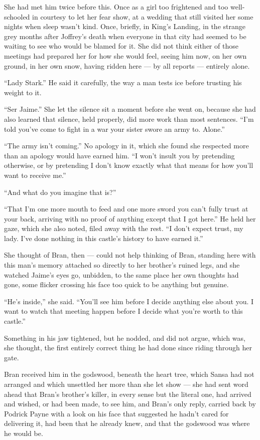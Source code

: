 She had met him twice before this. Once as a girl too frightened and too well-schooled in courtesy to let her fear show, at a wedding that still visited her some nights when sleep wasn’t kind. Once, briefly, in King’s Landing, in the strange grey months after Joffrey’s death when everyone in that city had seemed to be waiting to see who would be blamed for it. She did not think either of those meetings had prepared her for how she would feel, seeing him now, on her own ground, in her own snow, having ridden here — by all reports — entirely alone.

“Lady Stark.” He said it carefully, the way a man tests ice before trusting his weight to it.

“Ser Jaime.” She let the silence sit a moment before she went on, because she had also learned that silence, held properly, did more work than most sentences. “I’m told you’ve come to fight in a war your sister swore an army to. Alone.”

“The army isn’t coming.” No apology in it, which she found she respected more than an apology would have earned him. “I won’t insult you by pretending otherwise, or by pretending I don’t know exactly what that means for how you’ll want to receive me.”

“And what do you imagine that is?”

“That I’m one more mouth to feed and one more sword you can’t fully trust at your back, arriving with no proof of anything except that I got here.” He held her gaze, which she also noted, filed away with the rest. “I don’t expect trust, my lady. I’ve done nothing in this castle’s history to have earned it.”

She thought of Bran, then — could not help thinking of Bran, standing here with this man’s memory attached so directly to her brother’s ruined legs, and she watched Jaime’s eyes go, unbidden, to the same place her own thoughts had gone, some flicker crossing his face too quick to be anything but genuine.

“He’s inside,” she said. “You’ll see him before I decide anything else about you. I want to watch that meeting happen before I decide what you’re worth to this castle.”

Something in his jaw tightened, but he nodded, and did not argue, which was, she thought, the first entirely correct thing he had done since riding through her gate.

\sceneBreak

Bran received him in the godswood, beneath the heart tree, which Sansa had not arranged and which unsettled her more than she let show — she had sent word ahead that Bran’s brother’s killer, in every sense but the literal one, had arrived and wished, or had been made, to see him, and Bran’s only reply, carried back by Podrick Payne with a look on his face that suggested he hadn’t cared for delivering it, had been that he already knew, and that the godswood was where he would be.

